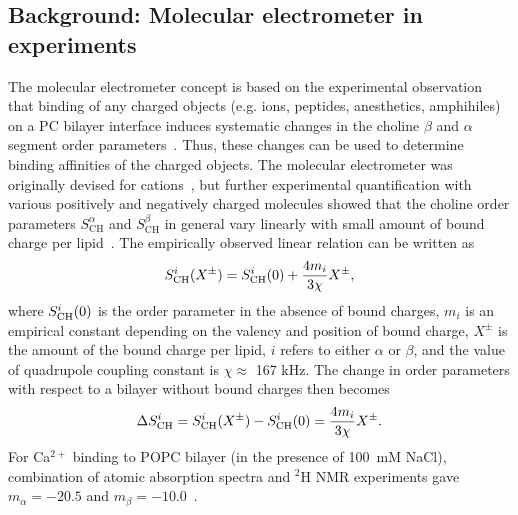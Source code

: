 \documentclass[twoside,twocolumn,9pt]{article}
\begin{document}
\subsection{Background: Molecular electrometer in experiments}\label{conceptinexperiments}
The molecular electrometer concept is based on the experimental observation that
binding of any charged objects (e.g. ions, peptides, anesthetics, amphihiles) on a PC bilayer interface induces 
systematic changes in the choline $\beta$ and $\alpha$
segment order parameters~\cite{brown77,akutsu81,altenbach84,altenbach85,seelig87,macdonald87,scherer89,roux90,beschiasvili91,marassi92,rydall92}.
Thus, these changes can be used to determine binding affinities of the charged objects.
The molecular electrometer was originally devised for cations~\cite{brown77,akutsu81,altenbach84}, but
further experimental quantification with various positively and negatively charged 
molecules showed that the choline order parameters $S_\mathrm{CH}^\alpha$ and $S_\mathrm{CH}^\beta$ 
in general vary linearly with small amount of bound charge per 
lipid~\cite{altenbach84,altenbach85,seelig87,macdonald87,scherer89,roux90,beschiasvili91,marassi92,rydall92}. 
The empirically observed linear relation can be written as~\cite{ferreira16}
\begin{equation}\label{electrometer_eq}
S_{\rm{CH}}^{i}(X^\pm)=S_{\rm{CH}}^{i}(0) + \frac{4m_i}{3\chi} X^\pm,
\end{equation}
where $S_{\rm{CH}}^{i}(0)$ is the order parameter in the absence of bound charges,
$m_i$ is an empirical constant depending on the valency and position of bound charge,
$X^\pm$ is the amount of the bound charge per lipid, 
$i$ refers to either $\alpha$ or $\beta$, and
the value of quadrupole coupling constant is $\chi \approx$ 167 kHz. 
The change in order parameters with respect to a bilayer without bound charges then becomes
\begin{equation}\label{OPchangeEQ}
\Delta S_{\rm{CH}}^{i}= S_{\rm{CH}}^{i}(X^\pm)-S_{\rm{CH}}^{i}(0) =\frac{4m_i }{3\chi}X^\pm.
\end{equation}
For Ca$^{2+}$ binding to POPC bilayer (in the presence of 100~mM NaCl),
combination of atomic absorption spectra and $^2$H NMR experiments gave
$m_\alpha=-20.5$  and $m_\beta=-10.0$~\cite{altenbach84}.
\end{document}
